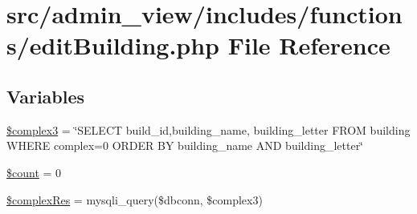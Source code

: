 \hypertarget{editBuilding_8php}{\section{src/admin\-\_\-view/includes/functions/edit\-Building.php \-File \-Reference}
\label{editBuilding_8php}
}
\subsection*{\-Variables}
\begin{DoxyCompactItemize}
\item 
\hyperlink{editBuilding_8php_a6f8a1bc2bbda3a3b8f381cc7b0b5f2fb}{\$complex3} = \char`\"{}\-S\-E\-L\-E\-C\-T build\-\_\-id,building\-\_\-name, building\-\_\-letter \-F\-R\-O\-M building \-W\-H\-E\-R\-E complex=0 \-O\-R\-D\-E\-R \-B\-Y building\-\_\-name \-A\-N\-D building\-\_\-letter\char`\"{}
\item 
\hyperlink{editBuilding_8php_af789423037bbc89dc7c850e761177570}{\$count} = 0
\item 
\hyperlink{editBuilding_8php_a8e5989179b69fda571d827939d1933d4}{\$complex\-Res} = mysqli\-\_\-query(\$dbconn, \$complex3)
\end{DoxyCompactItemize}


